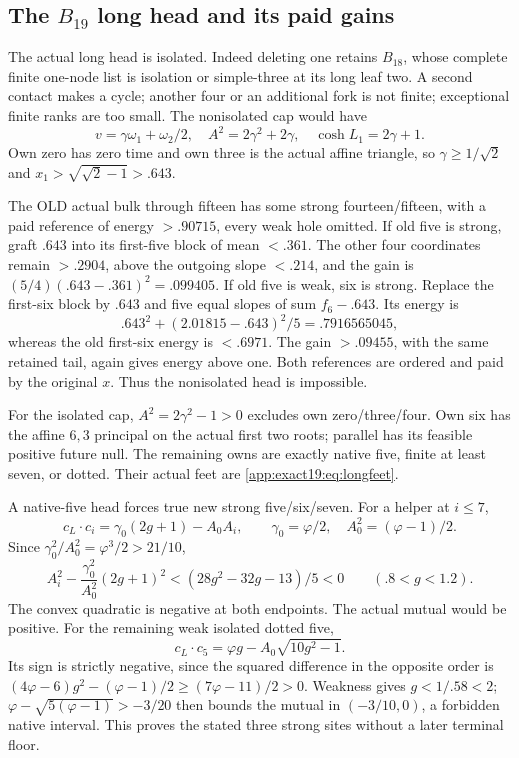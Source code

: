 \subsection{The \(B_{19}\) long head and its paid gains}
\label{app:exact19:Bhead}

The actual long head is isolated.
Indeed deleting one retains
\(B_{18}\), whose complete finite
one-node list is isolation or
simple-three at its long leaf two.
A second contact makes a cycle;
another four or an additional fork
is not finite; exceptional finite
ranks are too small.
The nonisolated cap would have
\[
 v=\gamma\omega_1+\omega_2/2,\quad
 A^2=2\gamma^2+2\gamma,\quad\cosh L_1=2\gamma+1 .
\]
Own zero has zero time and own
three is the actual affine
triangle, so \(\gamma\ge1/\sqrt2\)
and \(x_1>\sqrt{\sqrt2-1}>.643\).

The OLD actual bulk through fifteen
has some strong fourteen/fifteen,
with a paid reference of energy
\(>.90715\), every weak hole omitted.
If old five is strong, graft
\(.643\) into its first-five block
of mean \(<.361\).
The other four coordinates remain
\(>.2904\), above the outgoing
slope \(<.214\), and the gain is
\((5/4)(.643-.361)^2=.099405\).
If old five is weak, six is strong.
Replace the first-six block by
\(.643\) and five equal slopes
of sum \(f_6-.643\).
Its energy is
\[
 .643^2+(2.01815-.643)^2/5=.7916565045 ,
\]
whereas the old first-six energy
is \(<.6971\).
The gain \(>.09455\), with the
same retained tail, again gives
energy above one.
Both references are ordered and
paid by the original \(x\).
Thus the nonisolated head is
impossible.

For the isolated cap,
\(A^2=2\gamma^2-1>0\) excludes
own zero/three/four.
Own six has the affine \(6,3\)
principal on the actual first two
roots; parallel has its feasible
positive future null.
The remaining owns are exactly
native five, finite at least seven,
or dotted.
Their actual feet are
\eqref{app:exact19:eq:longfeet}.

A native-five head forces true
new strong five/six/seven.
For a helper at \(i\le7\),
\[
 c_L\cdot c_i=\gamma_0(2g+1)-A_0A_i,\qquad
       \gamma_0=\varphi/2,\quad A_0^2=(\varphi-1)/2 .
\]
Since \(\gamma_0^2/A_0^2=\varphi^3/2>21/10\),
\[
 A_i^2-\frac{\gamma_0^2}{A_0^2}(2g+1)^2
                   <(28g^2-32g-13)/5<0
                  \qquad(.8<g<1.2).
\]
The convex quadratic is negative
at both endpoints.
The actual mutual would be
positive.
For the remaining weak isolated
dotted five,
\[
 c_L\cdot c_5=\varphi g-A_0\sqrt{10g^2-1}.
\]
Its sign is strictly negative,
since the squared difference in
the opposite order is
\((4\varphi-6)g^2-(\varphi-1)/2
\ge(7\varphi-11)/2>0\).
Weakness gives \(g<1/.58<2\);
\(\varphi-\sqrt{5(\varphi-1)}>-3/20\)
then bounds the mutual in
\((-3/10,0)\), a forbidden native
interval.
This proves the stated three
strong sites without a later
terminal floor.

